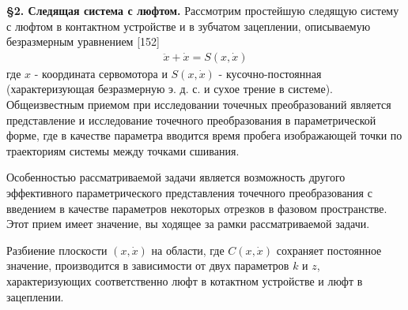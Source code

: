 \documentclass{article}
\begin{document}
\textbf{\S 2. Следящая система с люфтом.} Рассмотрим простейшую
следящую систему с люфтом в контактном устройстве и в зубчатом 
зацеплении, описываемую безразмерным уравнением [152]
\begin{gather}
\ddot{x}+\dot{x}=S(x, \dot{x})
\end{gather}
где $x$ - координата сервомотора и $S(x, \dot{x})$ - кусочно-постоянная
(характеризующая безразмерную э. д. с. и сухое трение в системе). 
Общеизвестным приемом при исследовании точечных преобразований 
является представление и исследование точечного преобразования в 
параметрической форме, где в качестве параметра вводится время пробега 
изображающей точки по траекториям системы между точками сшивания.%

Особенностью рассматриваемой задачи является возможность
другого эффективного параметрического представления точечного
преобразования с введением в качестве параметров некоторых
отрезков в фазовом пространстве. Этот прием имеет значение, вы
ходящее за рамки рассматриваемой задачи.%

Разбиение плоскости $(x, \dot{x})$ на области, где $C(x, \dot{x})$ сохраняет
постоянное значение, производится в зависимости от двух параметров 
$k$ и $z$, характеризующих соответственно люфт в котактном 
устройстве и люфт в зацеплении.%
\end{document}
